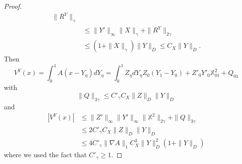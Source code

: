 \documentclass[a4paper,12pt,reqno]{amsart}
\newcommand{\norm}[1]{\|#1\|}
\begin{document}
\begin{proof}
\begin{equation}
\begin{split}
  \norm{R^Y}_\gamma
\\ & \le   \norm{Y'}_\infty \norm{X}_\gamma +
  \norm{R^Y}_{2\gamma}
\\ & \le   (1+\norm{X}_\gamma) \norm{Y}_D \le C_X \norm{Y}_D .
  \end{split}
\end{equation}
Then
\begin{equation*}
V^Y(x) = \int_0^1 A(x-Y_\eta) dY_\eta = \int_0^1 Z_\eta dY_\eta
 Z_0 (Y_1-Y_0) + Z'_0 Y'_0 \mathbb{X}^2_{01} + Q_{01}
\end{equation*}
with
$$
\norm{Q}_{3\gamma} \le C'_\gamma C_X \norm{Z}_{D} \norm{Y}_D
$$
and
\begin{equation*}
  \begin{split}
  |V^Y(x)| & \le  \norm{Z'}_\infty \norm{Y'}_\infty
   \norm{\mathbb{X}^2}_{2\gamma} + \norm{Q}_{3\gamma}
\\ & \le 2 C'_\gamma C_X \norm{Z}_D \norm{Y}_D
\\ & \le 4 C'_\gamma
\norm{\nabla A}_1 C_X^3 \norm{Y}_D^2 (1+\norm{Y}_D)
  \end{split}
\end{equation*}
where we used the fact that $C'_\gamma \ge 1$.


\end{proof}
\end{document}

